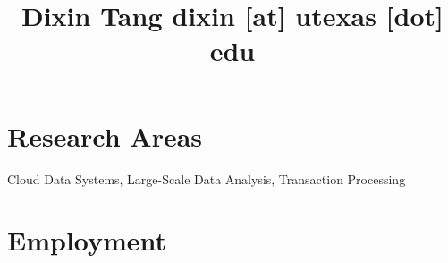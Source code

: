 \documentclass[10pt]{article} %
\begin{document}

\title{Dixin Tang {\small dixin [at] utexas [dot] edu}} %
\vspace{-5mm}

\begin{comment}
\parbox{0.5\textwidth}{ %
\begin{tabbing} %
\hspace{2.5cm} \= \hspace{4cm} \= \kill %
Postdoctoral Scholar \\
University of California, Berkeley \\
387 Soda Hall, Berkeley, CA 94720
\end{tabbing}}
\hfill %
\parbox{0.5\textwidth}{ %
\begin{tabbing} %
\hspace{2.5cm} \= \hspace{4cm} \= \kill %
(+1) 510-365-9300 \\
totemtang@berkeley.edu \\
\url{https://people.eecs.berkeley.edu/~totemtang/}
\end{tabbing}}
\vspace{-5mm}
\end{comment}


\section{Research Areas}

Cloud Data Systems, Large-Scale Data Analysis, Transaction Processing 

\vspace{-5mm}

\section{Employment}
\end{document}
